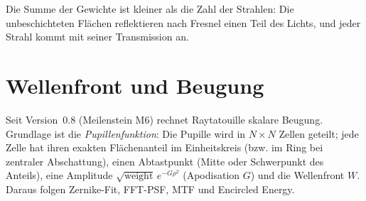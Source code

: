 \documentclass[11pt,a4paper,openany]{book}
\begin{document}
Die Summe der Gewichte ist kleiner als die Zahl der Strahlen: Die unbeschichteten Flächen
reflektieren nach Fresnel einen Teil des Lichts, und jeder Strahl kommt mit seiner Transmission
an.

\chapter{Wellenfront und Beugung}
\label{chap:beugung}

Seit Version~0.8 (Meilenstein M6) rechnet Raytatouille skalare Beugung. Grundlage ist die
\emph{Pupillenfunktion}: Die Pupille wird in $N\times N$ Zellen geteilt; jede Zelle hat ihren
exakten Flächenanteil im Einheitskreis (bzw. im Ring bei zentraler Abschattung), einen
Abtastpunkt (Mitte oder Schwerpunkt des Anteils), eine Amplitude
$\sqrt{\text{weight}}\,e^{-G\rho^2}$ (Apodisation $G$) und die Wellenfront $W$. Daraus folgen
Zernike-Fit, FFT-PSF, MTF und Encircled Energy.
\end{document}
